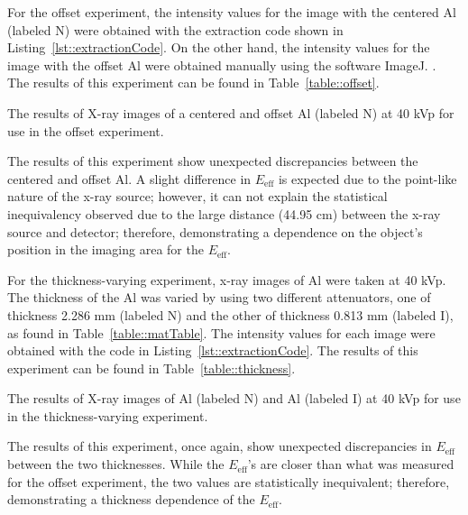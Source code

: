 \par For the offset experiment, the intensity values for the image with the centered Al (labeled N) were obtained with the extraction code shown in Listing~\ref{lst::extractionCode}. On the other hand, the intensity values for the image with the offset Al were obtained manually using the software ImageJ. \cite{ImageJ}. The results of this experiment can be found in Table~\ref{table::offset}.


\begin{table}[H]
    \small
    \noindent\makebox[\textwidth]{%
    
    }
    \caption{The results of X-ray images of a centered and offset Al (labeled N) at 40 kVp for use in the offset experiment.}
    \label{table::offset}
\end{table}

\par The results of this experiment show unexpected discrepancies between the centered and offset Al. A slight difference in $E_{\text{eff}}$ is expected due to the point-like nature of the x-ray source; however, it can not explain the statistical inequivalency observed due to the large distance (44.95 cm)\cite{CArm} between the x-ray source and detector; therefore, demonstrating a dependence on the object's position in the imaging area for the $E_{\text{eff}}$.

\par For the thickness-varying experiment, x-ray images of Al were taken at 40 kVp. The thickness of the Al was varied by using two different attenuators, one of thickness 2.286 mm (labeled N) and the other of thickness 0.813 mm (labeled I), as found in Table~\ref{table::matTable}. The intensity values for each image were obtained with the code in Listing~\ref{lst::extractionCode}. The results of this experiment can be found in Table~\ref{table::thickness}.

\begin{table}[H]
    \small
    \noindent\makebox[\textwidth]{%
    
    }
    \caption{The results of X-ray images of Al (labeled N) and Al (labeled I) at 40 kVp for use in the thickness-varying experiment.}
   	\label{table::thickness}
\end{table}

\par The results of this experiment, once again, show unexpected discrepancies in $E_{\text{eff}}$ between the two thicknesses. While the $E_{\text{eff}}$'s are closer than what was measured for the offset experiment, the two values are statistically inequivalent; therefore, demonstrating a thickness dependence of the $E_{\text{eff}}$.

